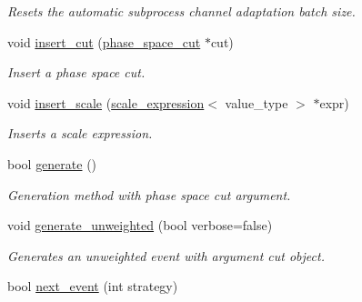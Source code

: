 \begin{DoxyCompactItemize}
\begin{DoxyCompactList}\small\item\em Resets the automatic subprocess channel adaptation batch size. \end{DoxyCompactList}\item 
\hypertarget{a00210_a023aec911a2b9fc2b94693325f371a0f}{void \hyperlink{a00210_a023aec911a2b9fc2b94693325f371a0f}{insert\-\_\-cut} (\hyperlink{a00413}{phase\-\_\-space\-\_\-cut} $\ast$cut)}\label{a00210_a023aec911a2b9fc2b94693325f371a0f}

\begin{DoxyCompactList}\small\item\em Insert a phase space cut. \end{DoxyCompactList}\item 
\hypertarget{a00210_ad0443bf8c289972eb5e4ed6f971d9efa}{void \hyperlink{a00210_ad0443bf8c289972eb5e4ed6f971d9efa}{insert\-\_\-scale} (\hyperlink{a00489}{scale\-\_\-expression}$<$ value\-\_\-type $>$ $\ast$expr)}\label{a00210_ad0443bf8c289972eb5e4ed6f971d9efa}

\begin{DoxyCompactList}\small\item\em Inserts a scale expression. \end{DoxyCompactList}\item 
\hypertarget{a00210_a05eabe92d7a8c45ac8cdd75bc97055df}{bool \hyperlink{a00210_a05eabe92d7a8c45ac8cdd75bc97055df}{generate} ()}\label{a00210_a05eabe92d7a8c45ac8cdd75bc97055df}

\begin{DoxyCompactList}\small\item\em Generation method with phase space cut argument. \end{DoxyCompactList}\item 
\hypertarget{a00210_a178f97ea294f513c157aff88b66a1046}{void \hyperlink{a00210_a178f97ea294f513c157aff88b66a1046}{generate\-\_\-unweighted} (bool verbose=false)}\label{a00210_a178f97ea294f513c157aff88b66a1046}

\begin{DoxyCompactList}\small\item\em Generates an unweighted event with argument cut object. \end{DoxyCompactList}\item 
\hypertarget{a00210_a18c627a5357c5aea36ff59fa393c5b14}{bool \hyperlink{a00210_a18c627a5357c5aea36ff59fa393c5b14}{next\-\_\-event} (int strategy)}\label{a00210_a18c627a5357c5aea36ff59fa393c5b14}


\end{DoxyCompactItemize}
